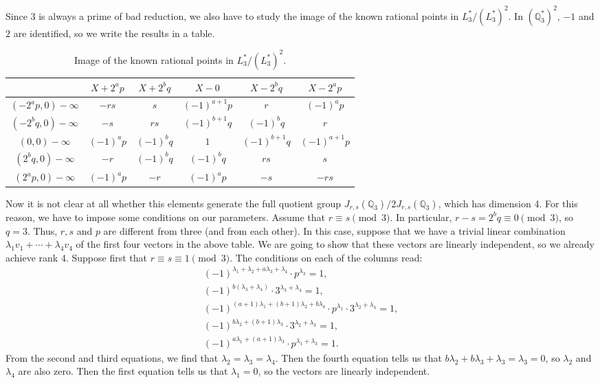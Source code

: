 \documentclass[a4paper, 12pt]{amsart}
\theoremstyle{definition}
\theoremstyle{plain}
\theoremstyle{plain}
\theoremstyle{plain}
\theoremstyle{plain}
\theoremstyle{remark}
\theoremstyle{remark}
\theoremstyle{plain}
\newcommand{\Q}{\mathbb{Q}}
\begin{document}
Since $3$ is always a prime of bad reduction, we also have to study the image of the known rational points in $L_3^*/(L_3^*)^2$. In $(\Q_3^*)^2$, $-1$ and $2$ are identified, so we write the results in a table.

\begin{table}[h!]
	\begin{center}
		\begin{tabular}{c|c|c|c|c|c}
			& $X+2^ap$ & $X+2^bq$ & $X-0$ & $X-2^bq$ & $X-2^ap$\\ \hline
			$(-2^ap,0)-\infty$&$-rs$ & $s$ & $(-1)^{a+1}p$ & $r$ & $(-1)^ap$\\ \hline
			$(-2^bq,0)-\infty$&$-s$ & $rs$ & $(-1)^{b+1}q$ & $(-1)^bq$ & $r$\\ \hline
			$(0,0)-\infty$&$(-1)^ap$ & $(-1)^bq$ & $1$ & $(-1)^{b+1}q$ & $(-1)^{a+1}p$\\ \hline
			$(2^bq,0)-\infty$&$-r$ & $(-1)^bq$ & $(-1)^bq$ & $rs$ & $s$\\ \hline
			$(2^ap,0)-\infty$&$(-1)^ap$ & $-r$ & $(-1)^ap$ & $-s$ & $-rs$
		\end{tabular}
		\vspace{10pt}
		\caption{Image of the known rational points in $L_3^*/(L_3^*)^2$.}
	\end{center}
\end{table}

Now it is not clear at all whether this elements generate the full quotient group $J_{r,s}(\Q_3)/2J_{r,s}(\Q_3)$, which has dimension 4. For this reason, we have to impose some conditions on our parameters. Assume that $r\equiv s\pmod3$. In particular, $r-s=2^bq\equiv0\pmod3$, so $q=3$. Thus, $r,s$ and $p$ are different from three (and from each other). In this case, suppose that we have a trivial linear combination $\lambda_1v_1+\cdots+\lambda_4v_4$ of the first four vectors in the above table. We are going to show that these vectors are linearly independent, so we already achieve rank 4. Suppose first that $r\equiv s\equiv 1\pmod3$. The conditions on each of the columns read:
\begin{align*}
	(-1)^{\lambda_1+\lambda_2+a\lambda_3+\lambda_4}\cdot p^{\lambda_3}=1,\\
	(-1)^{b(\lambda_3+\lambda_4)}\cdot 3^{\lambda_3+\lambda_4}=1,\\
	(-1)^{(a+1)\lambda_1+(b+1)\lambda_2+b\lambda_4}\cdot p^{\lambda_1}\cdot 3^{\lambda_2+\lambda_4}=1,\\
	(-1)^{b\lambda_2+(b+1)\lambda_3}\cdot 3^{\lambda_2+\lambda_3}=1,\\
	(-1)^{a\lambda_1+(a+1)\lambda_3}\cdot p^{\lambda_1+\lambda_3}=1.
\end{align*}
From the second and third equations, we find that $\lambda_2=\lambda_3=\lambda_4$. Then the fourth equation tells us that $b\lambda_2+b\lambda_3+\lambda_3=\lambda_3=0$, so $\lambda_2$ and $\lambda_4$ are also zero. Then the first equation tells us that $\lambda_1=0$, so the vectors are linearly independent.
\end{document}
